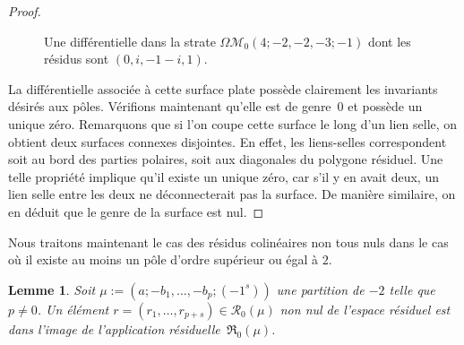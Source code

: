 \documentclass[11pt]{article}
\numberwithin{equation}{section}\renewcommand{\proofname}{Démonstration}
\let\mathcal\mathscr
\newcommand{\appres}[1][g]{\mathfrak{R}_{#1}}
\newcommand{\espres}[1][g]{\mathcal{R}_{#1}}
\newcommand{\omoduli}[1][g]{{\Omega\mathcal M}_{\!#1}}
\newtheorem{lem}[thm]{Lemme}
\theoremstyle{definition}
\begin{document}
\begin{proof}
\begin{figure}[htb]
\caption{Une différentielle dans la strate $\omoduli[0](4;-2,-2,-3;-1)$ dont les résidus sont $(0,i,-1-i,1)$.} \label{fig:casgeneralgenrezero}
\end{figure}

La différentielle associée à cette surface plate possède clairement les invariants désirés aux pôles. Vérifions maintenant qu'elle est de genre~$0$ et possède un unique zéro. Remarquons que si l'on coupe cette surface le long d'un lien selle, on obtient deux surfaces connexes disjointes. En effet, les liens-selles correspondent soit au bord des parties polaires, soit aux diagonales du polygone résiduel. Une telle propriété implique qu'il existe un unique zéro, car s'il y en avait deux, un lien selle entre les deux ne déconnecterait pas la surface. De manière similaire, on en déduit que le genre de la surface est nul.
\end{proof}

Nous traitons maintenant le cas des résidus colinéaires non tous nuls dans le cas où il existe au moins un pôle d'ordre supérieur ou égal à $2$.
\begin{lem}\label{lem:gzerogen2}
Soit $\mu:=(a;-b_{1},\dots,-b_{p};(-1^{s}))$ une partition de $-2$ telle que $p\neq0$. Un élément $r=(r_{1}, \dots , r_{p+s})\in\espres[0](\mu)$
non nul de l’espace résiduel est dans l’image de l'application résiduelle~$\appres[0](\mu)$.
\end{lem}
\end{document}
